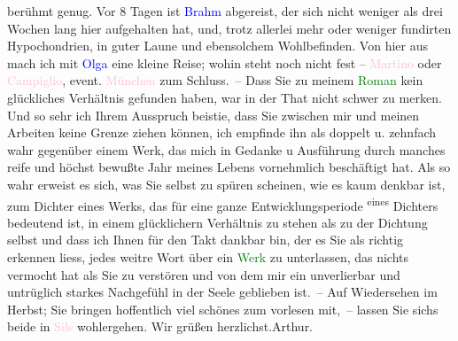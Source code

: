                berühmt genug. Vor 8 Tagen ist \textcolor{blue}{Brahm}{}\ledrightnote{\textcolor{blue}{Otto Brahm}} abgereist,
               der sich nicht weniger als drei Wochen lang hier aufgehalten hat, und, trotz allerlei
               mehr oder weniger fundirten Hypochondrien, in guter Laune und ebensolchem
               Wohlbefinden.\pend
           \pstart
           Von hier aus mach ich mit \textcolor{blue}{Olga}{}\ledrightnote{\textcolor{blue}{Olga Schnitzler}} eine kleine Reise;
               wohin steht noch nicht fest – \textcolor{pink}{Martino}{}\ledrightnote{\textcolor{pink}{San Martino di Castrozza}} oder \textcolor{pink}{Campiglio}{}\ledrightnote{\textcolor{pink}{Madonna di Campiglio}}, event. \textcolor{pink}{München}{}\ledrightnote{\textcolor{pink}{München}} zum Schluss. – Dass Sie zu {\pb}meinem \textcolor{green}{Roman}{} kein glückliches Verhältnis
               gefunden haben, war in der That nicht schwer zu merken. Und so sehr ich Ihrem
               Ausspruch beisti{\geminationm}e, dass Sie zwischen mir und meinen
               Arbeiten keine Grenze ziehen können, ich empfinde ihn als doppelt u. zehnfach wahr
               gegenüber einem Werk, das mich in Gedanke u Ausführung durch manches reife und \introOben{}höchst\introOben{} bewußte Jahr meines Lebens vornehmlich beschäftigt hat.
               Als so wahr erweist es sich, was Sie selbst zu spüren scheinen, wie es kaum denkbar
               ist, zum Dichter eines Werks, das für eine {\pb}ganze
               Entwicklungsperiode \substVorne{}\textsuperscript{eines}\substDazwischen{}\label{T_L01786_1v}\label{T_L01786_1h}\substHinten{} Dichters bedeutend ist, in einem glücklichern Verhältnis zu stehen als zu
               der Dichtung selbst und dass ich Ihnen für den Takt dankbar bin, der es Sie als
               richtig erkennen liess, jedes weitre Wort über ein \textcolor{green}{Werk}{}\ledrightnote{\textcolor{green}{Der Weg ins Freie. Roman}} zu unterlassen, das nichts vermocht hat als Sie zu verstören und von
               dem mir ein unverlierbar und untrüglich starkes \introOben{}\strikeout{\textcolor{gray}{×}\-\textcolor{gray}{×}\-\textcolor{gray}{×}\-\textcolor{gray}{×}\-\textcolor{gray}{×}\-\textcolor{gray}{×}\-\textcolor{gray}{×}\-\textcolor{gray}{×}\-\textcolor{gray}{×}\-\textcolor{gray}{×}}\introOben{} Nachgefühl in der Seele geblieben ist. –\pend
           \pstart
           Auf Wiedersehen im Herbst; Sie bringen hoffentlich viel schönes zum
               vorlesen mit, – lassen Sie sichs beide in \textcolor{pink}{Sils}{}\ledrightnote{\textcolor{pink}{Sils im Engadin}}
               wohlergehen.\pend
           \pstart Wir grüßen herzlichst.\spacefill\mbox{Arthur.}\pend{}\endnumbering{}  
      